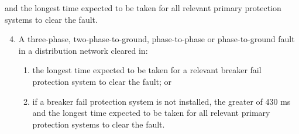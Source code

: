 		and the longest time expected to be taken for all relevant primary protection systems to clear the fault.
\begin{enumerate}
	\setcounter{enumi}{3}
	\item A three-phase, two-phase-to-ground, phase-to-phase or phase-to-ground fault in a distribution network cleared in:
	\begin{enumerate}[label=\roman*]
		\item the longest time expected to be taken for a relevant breaker fail protection system to clear the fault; or
		\item if a breaker fail protection system is not installed, the greater of 430 ms and the longest time expected to be taken for all relevant primary protection systems to clear the fault.
	\end{enumerate}
\end{enumerate}

